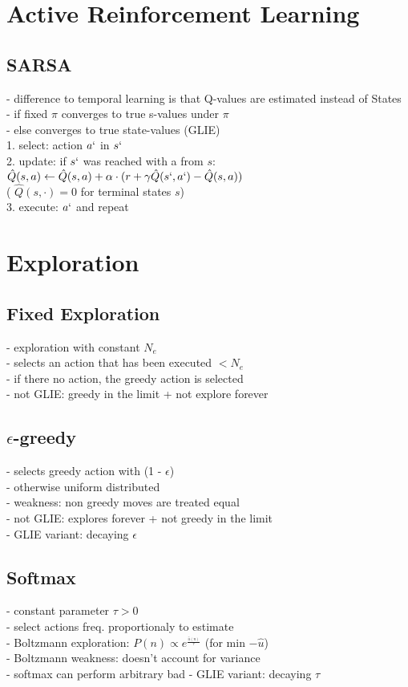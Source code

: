 \section*{Active Reinforcement Learning}
\subsection*{SARSA}
- difference to temporal learning is that Q-values are estimated instead of States \\
- if fixed $\pi$ converges to true s-values under $\pi$ \\
- else converges to true state-values (GLIE) \\ 
1. select: action $a`$ in $s`$ \\
2. update: if $s`$ was reached with a from $s$: \\
$\hat{Q}(s, a) \leftarrow \hat{Q}(s, a)+\alpha \cdot (r + \gamma \hat{Q}(s`, a`) - \hat{Q}(s, a))$ \\
( $\hat{Q}(s, \cdot) = 0$ for terminal states $s$) \\
3. execute: $a`$ and repeat


\section*{Exploration}
\subsection*{Fixed Exploration}
- exploration with constant $N_e$ \\
- selects an action that has been executed $< N_e$ \\
- if there no action, the greedy action is selected \\
- not GLIE: greedy in the limit +  not explore forever
 
\subsection*{$\epsilon$-greedy}
- selects greedy action with (1 - $\epsilon$) \\
- otherwise uniform distributed \\
- weakness: non greedy moves are treated equal \\
- not GLIE: explores forever + not greedy in the limit \\
- GLIE variant: decaying $\epsilon$

\subsection*{Softmax}
- constant parameter $\tau > 0$\\
- select actions freq. proportionaly to estimate \\
- Boltzmann exploration:  $P(n) \propto e^_{\frac{\hat{u}(n)}{\tau}}$ (for min $-\hat{u}$) \\
- Boltzmann weakness: doesn't account for variance \\
- softmax can perform arbitrary bad
- GLIE variant: decaying $\tau$

